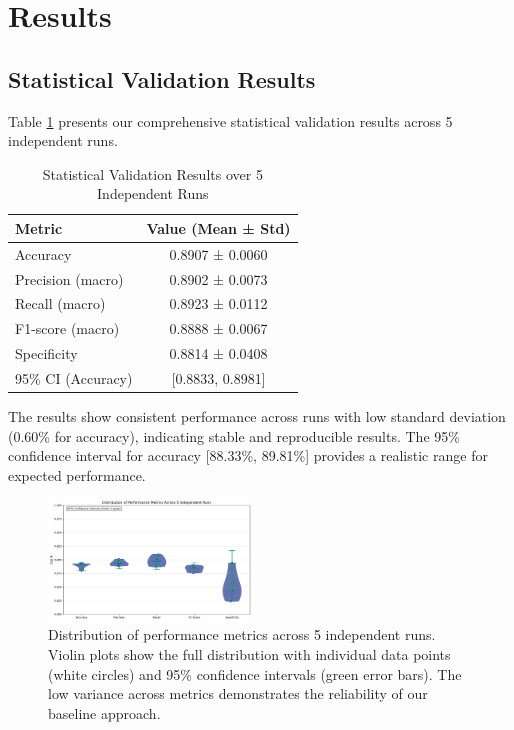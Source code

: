 \documentclass[conference]{IEEEtran}
\begin{document}
\section{Results}

\subsection{Statistical Validation Results}

Table \ref{tab:statistical_validation} presents our comprehensive statistical validation results across 5 independent runs.

\begin{table}[htbp]
\centering
\caption{Statistical Validation Results over 5 Independent Runs}
\label{tab:statistical_validation}
\begin{tabular}{lc}
\hline
\textbf{Metric} & \textbf{Value (Mean ± Std)} \\
\hline
Accuracy & 0.8907 ± 0.0060 \\
Precision (macro) & 0.8902 ± 0.0073 \\
Recall (macro) & 0.8923 ± 0.0112 \\
F1-score (macro) & 0.8888 ± 0.0067 \\
Specificity & 0.8814 ± 0.0408 \\
\hline
95\% CI (Accuracy) & [0.8833, 0.8981] \\
\hline
\end{tabular}
\end{table}

The results show consistent performance across runs with low standard deviation (0.60\% for accuracy), indicating stable and reproducible results. The 95\% confidence interval for accuracy [88.33\%, 89.81\%] provides a realistic range for expected performance.

\begin{figure}[H]
\centering
\includegraphics[width=0.48\textwidth]{figures/statistical_distributions.pdf}
\caption{Distribution of performance metrics across 5 independent runs. Violin plots show the full distribution with individual data points (white circles) and 95\% confidence intervals (green error bars). The low variance across metrics demonstrates the reliability of our baseline approach.}
\label{fig:statistical_distributions}
\end{figure}
\end{document}
